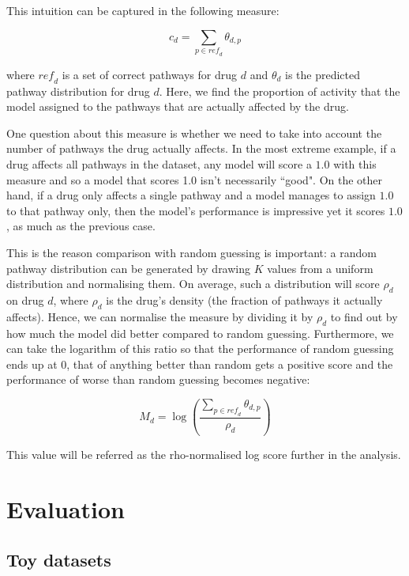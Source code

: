 \documentclass[12pt,a4paper,twoside,openright]{report}
\begin{document}
This intuition can be captured in the following measure:

\begin{equation}
c_d = \sum\limits_{p \in \mathit{ref}_d}{\theta_{d, p}}
\end{equation}

where $\mathit{ref}_d$ is a set of correct pathways for drug $d$ and $\theta_d$ is the predicted pathway distribution for drug $d$. Here, we find the proportion of activity that the model assigned to the pathways that are actually affected by the drug.

One question about this measure is whether we need to take into account the number of pathways the drug actually affects. In the most extreme example, if a drug affects all pathways in the dataset, any model will score a $1.0$ with this measure and so a model that scores 1.0 isn't necessarily ``good". On the other hand, if a drug only affects a single pathway and a model manages to assign $1.0$ to that pathway only, then the model's performance is impressive yet it scores $1.0$, as much as the previous case.

This is the reason comparison with random guessing is important: a random pathway distribution can be generated by drawing $K$ values from a uniform distribution and normalising them. On average, such a distribution will score $\rho_d$ on drug $d$, where $\rho_d$ is the drug's density (the fraction of pathways it actually affects). Hence, we can normalise the measure by dividing it by $\rho_d$ to find out by how much the model did better compared to random guessing. Furthermore, we can take the logarithm of this ratio so that the performance of random guessing ends up at 0, that of anything better than random gets a positive score and the performance of worse than random guessing becomes negative:

\begin{equation}\label{eq:rho-normalised-score}
M_d = \log(\frac{\sum\limits_{p \in \mathit{ref}_d}{\theta_{d, p}}}{\rho_d})
\end{equation}

This value will be referred as the rho-normalised log score further in the analysis.

\chapter{Evaluation}

\section{Toy datasets}
\end{document}
